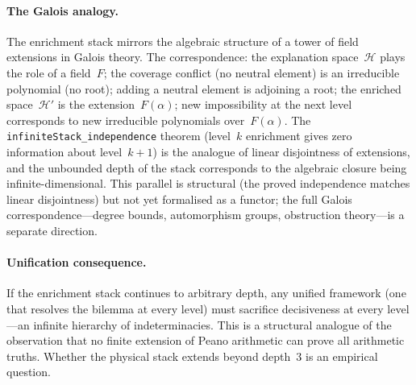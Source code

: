 \documentclass[11pt,a4paper]{article}
\newcommand{\sH}{\mathcal{H}}
\begin{document}
\paragraph{The Galois analogy.}
The enrichment stack mirrors the algebraic structure of a tower of field extensions in Galois theory.  The correspondence: the explanation space~$\sH$ plays the role of a field~$F$; the coverage conflict (no neutral element) is an irreducible polynomial (no root); adding a neutral element is adjoining a root; the enriched space~$\sH'$ is the extension~$F(\alpha)$; new impossibility at the next level corresponds to new irreducible polynomials over~$F(\alpha)$.  The \texttt{infiniteStack\_independence} theorem (level~$k$ enrichment gives zero information about level~$k+1$) is the analogue of linear disjointness of extensions, and the unbounded depth of the stack corresponds to the algebraic closure being infinite-dimensional.  This parallel is structural (the proved independence matches linear disjointness) but not yet formalised as a functor; the full Galois correspondence---degree bounds, automorphism groups, obstruction theory---is a separate direction.

\paragraph{Unification consequence.}
If the enrichment stack continues to arbitrary depth, any unified framework (one that resolves the bilemma at every level) must sacrifice decisiveness at every level---an infinite hierarchy of indeterminacies. This is a structural analogue of the observation that no finite extension of Peano arithmetic can prove all arithmetic truths. Whether the physical stack extends beyond depth~3 is an empirical question.
\end{document}
